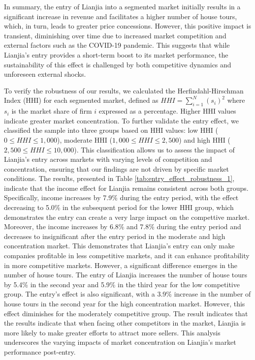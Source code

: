 \documentclass[11pt]{article}
\begin{document}
In summary, the entry of Lianjia into a segmented market initially results in a significant increase in revenue and facilitates a higher number of house tours, which, in turn, leads to greater price concessions. However, this positive impact is transient, diminishing over time due to increased market competition and external factors such as the COVID-19 pandemic. This suggests that while Lianjia's entry provides a short-term boost to its market performance, the sustainability of this effect is challenged by both competitive dynamics and unforeseen external shocks.

To verify the robustness of our results, we calculated the Herfindahl-Hirschman Index (HHI) for each segmented market, defined as $HHI = \sum_{i=1}^N (s_i)^2$ where $s_i$ is the market share of firm $i$ expressed as a percentage. Higher HHI values indicate greater market concentration. To further validate the entry effect, we classified the sample into three groups based on HHI values: low HHI ($0 \leq HHI \leq 1,000$), moderate HHI ($1,000 \leq HHI \leq 2,500$) and high HHI ($2,500 \leq HHI \leq 10,000$). This classification allows us to assess the impact of Lianjia's entry across markets with varying levels of competition and concentration, ensuring that our findings are not driven by specific market conditions. The results, presented in Table \ref{tab:entry_effect_robustness_1}, indicate that the income effect for Lianjia remains consistent across both groups. Specifically, income increases by 7.9\% during the entry period, with the effect decreasing to 5.0\% in the subsequent period for the lower HHI group, which demonstrates the entry can create a very large impact on the compettive market. Moreover, the income increases by 6.8\% and 7.8\% during the entry period and decreases to insignificant after the entry period in the moderate and high concentration market. This demonstrates that Lianjia's entry can only make companies profitable in less competitive markets, and it can enhance profitability in more competitive markets. However, a significant difference emerges in the number of house tours. The entry of Lianjia increases the number of house tours by 5.4\% in the second year and 5.9\% in the third year for the low competitive group. The entry's effect is also significant, with a 3.9\% increase in the number of house tours in the second year for the high concentration market. However, this effect diminishes for the moderately competitive group. The result indicates that the results indicate that when facing other competitors in the market, Lianjia is more likely to make greater efforts to attract more sellers. This analysis underscores the varying impacts of market concentration on Lianjia's market performance post-entry.
\end{document}
